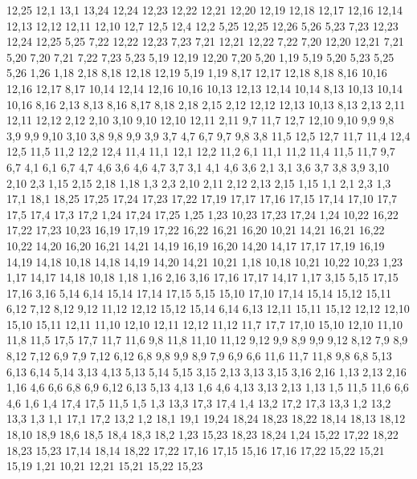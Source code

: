 12,25
%
12,1
13,1
13,24
12,24
12,23
12,22
12,21
12,20
12,19
12,18
12,17
12,16
12,14
12,13
12,12
12,11
12,10
12,7
12,5
12,4
12,2
%
5,25
12,25
12,26
5,26
%
5,23
7,23
12,23
12,24
12,25
5,25
%
7,22
12,22
12,23
7,23
%
7,21
12,21
12,22
7,22
%
7,20
12,20
12,21
7,21
%
5,20
7,20
7,21
7,22
7,23
5,23
%
5,19
12,19
12,20
7,20
5,20
%
1,19
5,19
5,20
5,23
5,25
5,26
1,26
%
1,18
2,18
8,18
12,18
12,19
5,19
1,19
%
8,17
12,17
12,18
8,18
%
8,16
10,16
12,16
12,17
8,17
%
10,14
12,14
12,16
10,16
%
10,13
12,13
12,14
10,14
%
8,13
10,13
10,14
10,16
8,16
%
2,13
8,13
8,16
8,17
8,18
2,18
2,15
%
2,12
12,12
12,13
10,13
8,13
2,13
%
2,11
12,11
12,12
2,12
%
2,10
3,10
9,10
12,10
12,11
2,11
%
9,7
11,7
12,7
12,10
9,10
9,9
9,8
%
3,9
9,9
9,10
3,10
%
3,8
9,8
9,9
3,9
%
3,7
4,7
6,7
9,7
9,8
3,8
%
11,5
12,5
12,7
11,7
%
11,4
12,4
12,5
11,5
%
11,2
12,2
12,4
11,4
%
11,1
12,1
12,2
11,2
%
6,1
11,1
11,2
11,4
11,5
11,7
9,7
6,7
%
4,1
6,1
6,7
4,7
4,6
%
3,6
4,6
4,7
3,7
%
3,1
4,1
4,6
3,6
%
2,1
3,1
3,6
3,7
3,8
3,9
3,10
2,10
2,3
%
1,15
2,15
2,18
1,18
%
1,3
2,3
2,10
2,11
2,12
2,13
2,15
1,15
%
1,1
2,1
2,3
1,3
17,1
18,1
18,25
17,25
17,24
17,23
17,22
17,19
17,17
17,16
17,15
17,14
17,10
17,7
17,5
17,4
17,3
17,2
%
1,24
17,24
17,25
1,25
%
1,23
10,23
17,23
17,24
1,24
%
10,22
16,22
17,22
17,23
10,23
%
16,19
17,19
17,22
16,22
16,21
16,20
%
10,21
14,21
16,21
16,22
10,22
%
14,20
16,20
16,21
14,21
%
14,19
16,19
16,20
14,20
%
14,17
17,17
17,19
16,19
14,19
14,18
%
10,18
14,18
14,19
14,20
14,21
10,21
%
1,18
10,18
10,21
10,22
10,23
1,23
%
1,17
14,17
14,18
10,18
1,18
%
1,16
2,16
3,16
17,16
17,17
14,17
1,17
%
3,15
5,15
17,15
17,16
3,16
%
5,14
6,14
15,14
17,14
17,15
5,15
%
15,10
17,10
17,14
15,14
15,12
15,11
%
6,12
7,12
8,12
9,12
11,12
12,12
15,12
15,14
6,14
6,13
%
12,11
15,11
15,12
12,12
%
12,10
15,10
15,11
12,11
%
11,10
12,10
12,11
12,12
11,12
%
11,7
17,7
17,10
15,10
12,10
11,10
11,8
%
11,5
17,5
17,7
11,7
11,6
%
9,8
11,8
11,10
11,12
9,12
9,9
%
8,9
9,9
9,12
8,12
%
7,9
8,9
8,12
7,12
%
6,9
7,9
7,12
6,12
%
6,8
9,8
9,9
8,9
7,9
6,9
%
6,6
11,6
11,7
11,8
9,8
6,8
%
5,13
6,13
6,14
5,14
%
3,13
4,13
5,13
5,14
5,15
3,15
%
2,13
3,13
3,15
3,16
2,16
%
1,13
2,13
2,16
1,16
%
4,6
6,6
6,8
6,9
6,12
6,13
5,13
4,13
%
1,6
4,6
4,13
3,13
2,13
1,13
%
1,5
11,5
11,6
6,6
4,6
1,6
%
1,4
17,4
17,5
11,5
1,5
%
1,3
13,3
17,3
17,4
1,4
%
13,2
17,2
17,3
13,3
%
1,2
13,2
13,3
1,3
%
1,1
17,1
17,2
13,2
1,2
18,1
19,1
19,24
18,24
18,23
18,22
18,14
18,13
18,12
18,10
18,9
18,6
18,5
18,4
18,3
18,2
%
1,23
15,23
18,23
18,24
1,24
%
15,22
17,22
18,22
18,23
15,23
%
17,14
18,14
18,22
17,22
17,16
17,15
%
15,16
17,16
17,22
15,22
15,21
15,19
%
1,21
10,21
12,21
15,21
15,22
15,23
